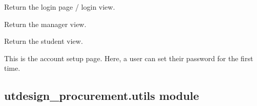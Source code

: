 \documentclass[letterpaper,10pt,english]{sphinxmanual}
\begin{document}
\begin{fulllineitems}

\begin{fulllineitems}
\label{\detokenize{apidoc/utdesign_procurement:utdesign_procurement.server.Root.login}}
Return the login page / login view.

\end{fulllineitems}


\begin{fulllineitems}
\label{\detokenize{apidoc/utdesign_procurement:utdesign_procurement.server.Root.manager}}
Return the manager view.

\end{fulllineitems}


\begin{fulllineitems}
\label{\detokenize{apidoc/utdesign_procurement:utdesign_procurement.server.Root.student}}
Return the student view.

\end{fulllineitems}


\begin{fulllineitems}
\label{\detokenize{apidoc/utdesign_procurement:utdesign_procurement.server.Root.verify}}
This is the account setup page. Here, a user can set their password
for the first time.

\end{fulllineitems}


\end{fulllineitems}



\subsection{utdesign\_procurement.utils module}
\label{\detokenize{apidoc/utdesign_procurement:module-utdesign_procurement.utils}}\label{\detokenize{apidoc/utdesign_procurement:utdesign-procurement-utils-module}}
\end{document}

